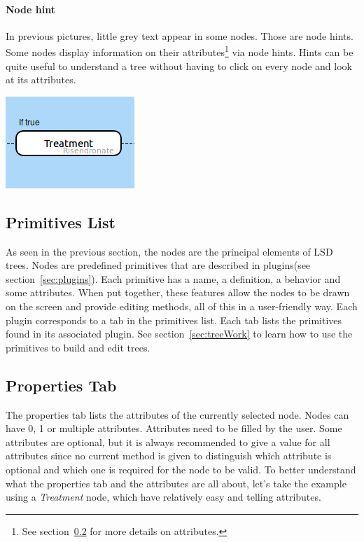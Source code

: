 \documentclass[a4paper,11pt]{report}
\begin{document}
\paragraph{Node hint}
In previous pictures, little grey text appear in some nodes. Those are node hints. Some nodes display information on their attributes\footnote{See section~\ref{sec:propTab} for more details on attributes.} via node hints. Hints can be quite useful to understand a tree without having to click on every node and look at its attributes.

\begin{center}
\includegraphics[scale=0.4]{Pictures/TreeEditor/nodeHint.png}
\label{fig:nodeHint}
\end{center}

\subsection{Primitives List}
As seen in the previous section, the nodes are the principal elements of LSD trees. Nodes are predefined primitives that are described in plugins(see section~\ref{sec:plugins}). Each primitive has a name, a definition, a behavior and some attributes. When put together, these features allow the nodes to be drawn on the screen and provide editing methods, all of this in a user-friendly way. Each plugin corresponds to a tab in the primitives list. Each tab lists the primitives found in its associated plugin. See section{~\ref{sec:treeWork}} to learn how to use the primitives to build and edit trees.

\subsection{Properties Tab}
\label{sec:propTab}
The properties tab lists the attributes of the currently selected node. Nodes can have 0, 1 or multiple attributes. Attributes need to be filled by the user. Some attributes are optional, but it is always recommended to give a value for all attributes since no current method is given to distinguish which attribute is optional and which one is required for the node to be valid. To better understand what the properties tab and the attributes are all about, let's take the example using a \emph{Treatment} node, which have relatively easy and telling attributes.
\end{document}
